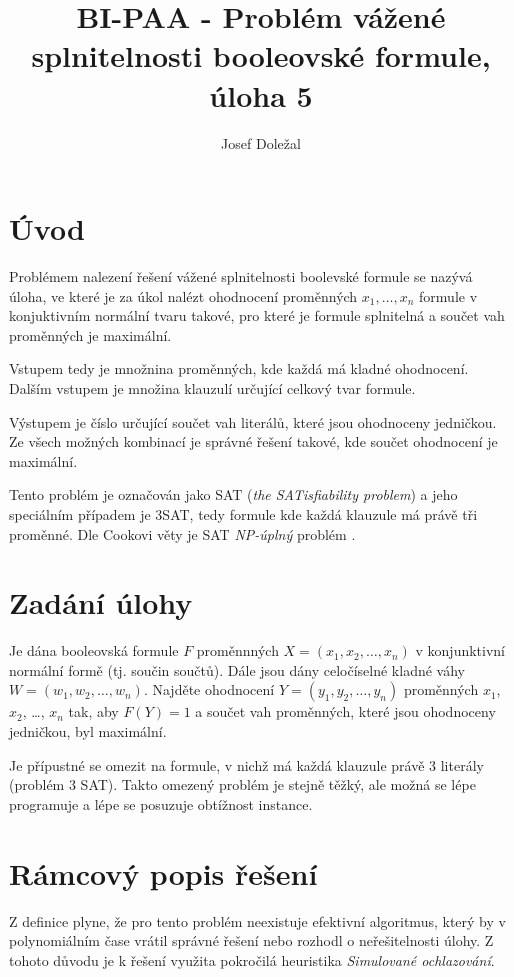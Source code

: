 \documentclass[czech]{article}
\title{BI-PAA - Problém vážené splnitelnosti booleovské formule, úloha 5}
\author{Josef Doležal}
\begin{document}
\maketitle

\newpage

\section{Úvod}
Problémem nalezení řešení vážené splnitelnosti boolevské formule se nazývá úloha, ve které je za úkol nalézt ohodnocení proměnných $x_1, \dots, x_n$ formule v konjuktivním normální tvaru takové, pro které je formule splnitelná a součet vah proměnných je maximální.

Vstupem tedy je množnina proměnných, kde každá má kladné ohodnocení.
Dalším vstupem je množina klauzulí určující celkový tvar formule.

Výstupem je číslo určující součet vah literálů, které jsou ohodnoceny jedničkou.
Ze všech možných kombinací je správné řešení takové, kde součet ohodnocení je maximální.

Tento problém je označován jako SAT (\textit{the SATisfiability problem}) a jeho speciálním případem je 3SAT, tedy formule kde každá klauzule má právě tři proměnné.
Dle Cookovi věty je SAT \textit{NP-úplný} problém \citep{sat-npc}.

\section{Zadání úlohy}

Je dána booleovská formule $F$ proměnnných $X=(x_1, x_2, \dots, x_n)$ v konjunktivní normální formě (tj. součin součtů).
Dále jsou dány celočíselné kladné váhy $W=(w_1, w_2, \dots, w_n)$.
Najděte ohodnocení $Y=(y_1, y_2, \dots, y_n)$ proměnných $x_1$, $x_2$, \dots, $x_n$ tak, aby $F(Y)=1$ a součet vah proměnných, které jsou ohodnoceny jedničkou, byl maximální.

Je přípustné se omezit na formule, v nichž má každá klauzule právě 3 literály (problém 3 SAT).
Takto omezený problém je stejně těžký, ale možná se lépe programuje a lépe se posuzuje obtížnost instance.

\section{Rámcový popis řešení}

Z definice plyne, že pro tento problém neexistuje efektivní algoritmus, který by v polynomiálním čase vrátil správné řešení nebo rozhodl o neřešitelnosti úlohy.
Z tohoto důvodu je k řešení využita pokročilá heuristika \textit{Simulované ochlazování}.
\end{document}

